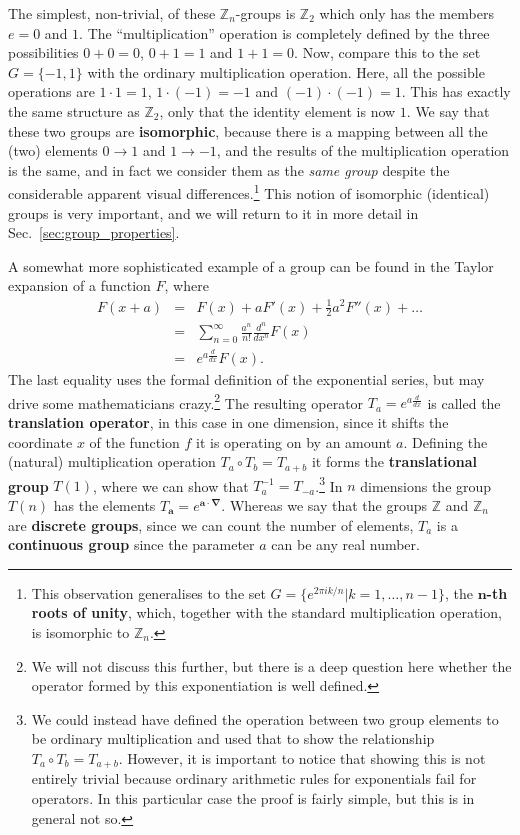 \documentclass[notes.tex]{subfiles}
\begin{document}
The simplest, non-trivial, of these $\mathbb{Z}_n$-groups is $\mathbb{Z}_2$ which only has the members $e=0$ and $1$. The ``multiplication'' operation is completely defined by the three possibilities $0+0=0$, $0+1=1$ and $1+1=0$. Now, compare this to the set $G=\{-1,1\}$ with the ordinary multiplication operation. Here, all the possible operations are $1\cdot 1=1$, $1\cdot (-1)=-1$ and $(-1)\cdot (-1)=1$. This has exactly the same structure as $\mathbb{Z}_2$, only that the identity element is now $1$.  We say that these two groups are {\bf isomorphic}, because there is a mapping between all the (two) elements $0\to 1$ and $1\to -1$, and the results of the multiplication operation is the same, and in fact we consider them as the {\it same group} despite the considerable apparent visual differences.\footnote{This observation  generalises to the set $G=\{e^{2\pi ik/n} | k=1,\ldots,n-1\}$, the {\bf $\mathbf n$-th roots of unity}, which, together with the standard multiplication operation, is isomorphic to  $\mathbb{Z}_n$.} 
This notion of isomorphic (identical) groups is very important, and we will return to it in more detail in Sec.~\ref{sec:group_properties}.

A somewhat more sophisticated example of a group can be found in the Taylor expansion of a function $F$, where
\begin{eqnarray*}
F(x+a) &=& F(x) + aF'(x) + \frac{1}{2} a^2 F''(x) + \ldots \\
&=& \sum_{n=0}^{\infty}\frac{a^n}{n!}\frac{d^n}{dx^n} F(x)\\
&=& e^{a\frac{d}{dx}} F(x).
\end{eqnarray*}
The last equality uses the formal definition of the exponential series, but may drive some mathematicians crazy.\footnote{We will not discuss this further, but there is a deep question here whether the operator formed by this exponentiation is well defined.}  The resulting operator $T_a = e^{a\frac{d}{dx}}$ is called the {\bf translation operator}, in this case in one dimension, since it shifts the coordinate $x$ of the function $f$ it is operating on by an amount $a$. Defining the (natural) multiplication operation
$T_a \circ T_b = T_{a+b}$
it forms the {\bf translational group} $T(1)$, where we can show that $T_a^{-1} = T_{-a}$.\footnote{We could instead have defined the operation between two group elements to be ordinary multiplication and used that to show the relationship $T_a \circ T_b = T_{a+b}$. However, it is important to notice that showing this is not entirely trivial because ordinary arithmetic rules for exponentials fail for operators. In this particular case the proof is fairly simple, but this is in general not so.} In $n$ dimensions the group $T(n)$ has the elements  $T_{\mathbf{a}} = e^{\mathbf{a}\cdot \mathbf{\nabla}}$. Whereas we say that the groups $\mathbb{Z}$ and $\mathbb{Z}_n$ are {\bf discrete groups}, since we can count the number of elements, $T_a$ is a {\bf continuous group} since the parameter $a$ can be any real number. 
\end{document}

